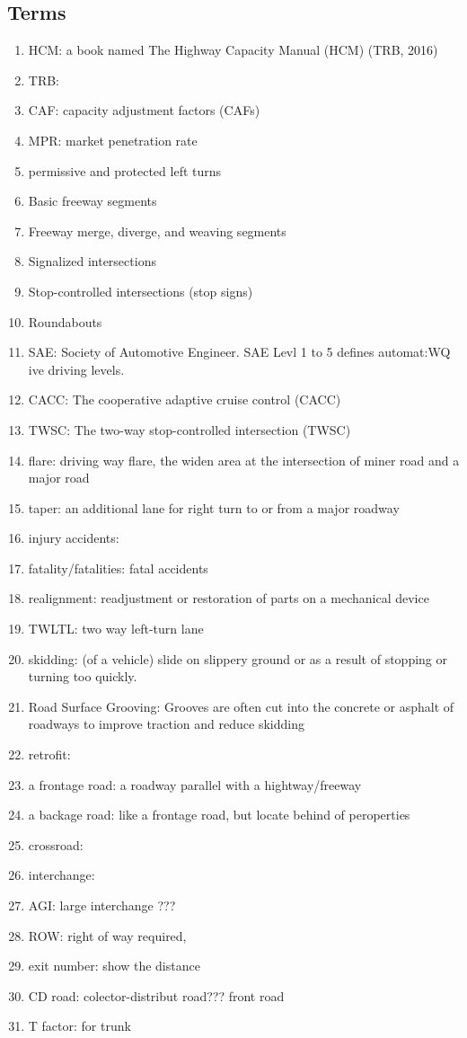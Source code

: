 \documentclass[11pt]{article}
\begin{document}
  \subsection{Terms}
  \begin{enumerate}
    \item HCM: a book named The Highway Capacity Manual (HCM) (TRB, 2016) 
    \item TRB: 
    \item CAF: capacity adjustment factors (CAFs) 
    \item MPR: market penetration rate
    \item permissive and protected left turns
    \item Basic freeway segments
    \item Freeway merge, diverge, and weaving segments
    \item Signalized intersections
    \item Stop-controlled intersections (stop signs)
    \item Roundabouts
    \item SAE: Society of Automotive Engineer. SAE Levl 1 to 5 defines automat:WQ
    ive driving levels.
    \item CACC: The cooperative adaptive cruise control (CACC)
    \item TWSC: The two-way stop-controlled intersection (TWSC) 
    \item flare: driving way flare, the widen area at the intersection of miner road and a major road
    \item taper: an additional lane for right turn to or from a major roadway
    \item injury accidents: 
    \item fatality/fatalities: fatal accidents
    \item realignment: readjustment or restoration of parts on a mechanical device 
    \item TWLTL: two way left-turn lane
    \item skidding: (of a vehicle) slide on slippery ground or as a result of stopping or turning too quickly.
    \item Road Surface Grooving: Grooves are often cut into the concrete or asphalt of roadways to improve traction and reduce skidding
    \item retrofit: 
    \item a frontage road: a roadway parallel with a hightway/freeway
    \item a backage road: like a frontage road, but locate behind of peroperties
    \item crossroad:
    \item interchange:
    \item AGI: large interchange ???
    \item ROW: right of way required, 
    \item exit number: show the distance  
    \item CD road: colector-distribut road??? front road 
    \item T factor: for trunk 
  \end{enumerate}
\end{document}
